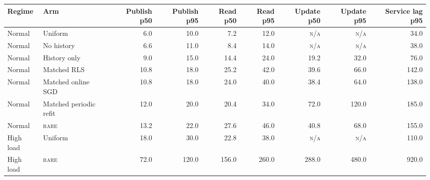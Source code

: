 \documentclass[10pt,a4paper,landscape]{article}
\newcommand{\rare}{\textsc{rare}}\newcommand{\na}{\textsc{n/a}}\newcommand{\nog}{\textsc{no-go}}\newcommand{\ok}{\textsc{pass}}
\begin{document}
\begin{center}\scriptsize\begin{tabular}{llrrrrrrr}\toprule Regime & Arm & Publish p50 & Publish p95 & Read p50 & Read p95 & Update p50 & Update p95 & Service lag p95 \\\midrule
Normal & Uniform & 6.0 & 10.0 & 7.2 & 12.0 & \na & \na & 34.0 \\

Normal & No history & 6.6 & 11.0 & 8.4 & 14.0 & \na & \na & 38.0 \\

Normal & History only & 9.0 & 15.0 & 14.4 & 24.0 & 19.2 & 32.0 & 76.0 \\

Normal & Matched RLS & 10.8 & 18.0 & 25.2 & 42.0 & 39.6 & 66.0 & 142.0 \\

Normal & Matched online SGD & 10.8 & 18.0 & 24.0 & 40.0 & 38.4 & 64.0 & 138.0 \\

Normal & Matched periodic refit & 12.0 & 20.0 & 20.4 & 34.0 & 72.0 & 120.0 & 185.0 \\

Normal & \rare{} & 13.2 & 22.0 & 27.6 & 46.0 & 40.8 & 68.0 & 155.0 \\

High load & Uniform & 18.0 & 30.0 & 22.8 & 38.0 & \na & \na & 110.0 \\

High load & \rare{} & 72.0 & 120.0 & 156.0 & 260.0 & 288.0 & 480.0 & 920.0 \\

\bottomrule\end{tabular}\end{center}
\end{document}
